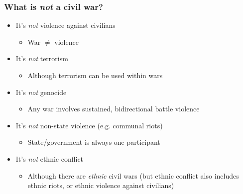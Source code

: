 \documentclass[utf8, xcolor=dvipsnames]{beamer}
\begin{document}
\begin{frame}
\frametitle{What is \textit{not} a civil war?}
\centering

\begin{itemize}
  \item<1> It's \textit{not} violence against civilians
  \begin{itemize}
    \item War $\neq$ violence
  \end{itemize}
  \item<2> It's \textit{not} terrorism
  \begin{itemize}
    \item Although terrorism can be used within wars
  \end{itemize}
  \item<3> It's \textit{not} genocide
  \begin{itemize}
    \item Any war involves sustained, bidirectional battle violence
  \end{itemize}
  \item<4> It's \textit{not} non-state violence (e.g. communal riots)
  \begin{itemize}
    \item State/government is always one participant
  \end{itemize}
  \item<5> It's \textit{not} ethnic conflict
  \begin{itemize}
    \item Although there are \textit{ethnic} civil wars (but ethnic conflict also includes ethnic riots, or ethnic violence against civilians)
  \end{itemize}
\end{itemize}

\end{frame}
\end{document}
